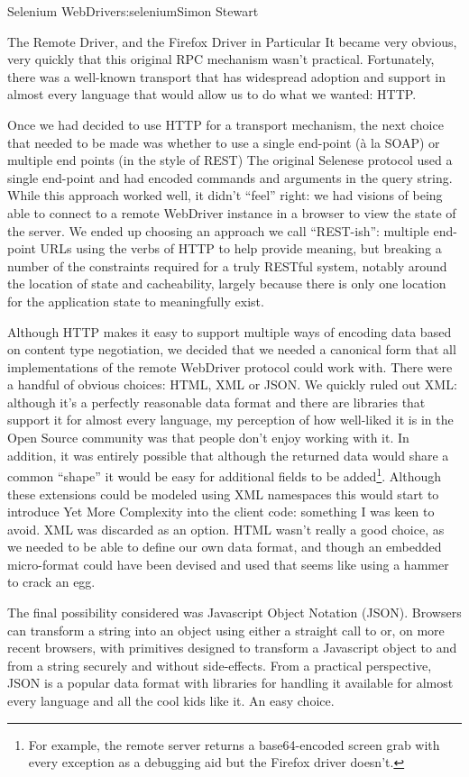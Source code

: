 \begin{aosachapter}{Selenium WebDriver}{s:selenium}{Simon Stewart}
\begin{aosasect1}{The Remote Driver, and the Firefox Driver in Particular}
It became very obvious, very quickly that this original RPC mechanism
wasn't practical. Fortunately, there was a well-known transport that
has widespread adoption and support in almost every language that
would allow us to do what we wanted: HTTP.

Once we had decided to use HTTP for a transport mechanism, the next
choice that needed to be made was whether to use a single end-point
(\`{a} la SOAP) or multiple end points (in the style of REST) The
original Selenese protocol used a single end-point and had encoded
commands and arguments in the query string. While this approach worked
well, it didn't ``feel'' right: we had visions of being able to
connect to a remote WebDriver instance in a browser to view the state
of the server. We ended up choosing an approach we call ``REST-ish'':
multiple end-point URLs using the verbs of HTTP to help provide
meaning, but breaking a number of the constraints required for a truly
RESTful system, notably around the location of state and cacheability,
largely because there is only one location for the application state
to meaningfully exist.

Although HTTP makes it easy to support multiple ways of encoding data
based on content type negotiation, we decided that we needed a
canonical form that all implementations of the remote WebDriver
protocol could work with. There were a handful of obvious choices:
HTML, XML or JSON\@. We quickly ruled out XML: although it's a
perfectly reasonable data format and there are libraries that support
it for almost every language, my perception of how well-liked it is in
the Open Source community was that people don't enjoy working with
it. In addition, it was entirely possible that although the returned
data would share a common ``shape'' it would be easy for additional
fields to be added\footnote{For example, the remote server returns a
base64-encoded screen grab with every exception as a debugging aid
but the Firefox driver doesn't.}. Although these extensions could be
modeled using XML namespaces this would start to introduce Yet More
Complexity into the client code: something I was keen to avoid.  XML
was discarded as an option.  HTML wasn't really a good choice, as we
needed to be able to define our own data format, and though an
embedded micro-format could have been devised and used that seems like
using a hammer to crack an egg.

The final possibility considered was Javascript Object Notation
(JSON). Browsers can transform a string into an object using either a
straight call to  or, on more recent browsers, with
primitives designed to transform a Javascript object to and from a
string securely and without side-effects. From a practical
perspective, JSON is a popular data format with libraries for handling
it available for almost every language and all the cool kids like
it. An easy choice.


\end{aosasect1}
\end{aosachapter}
